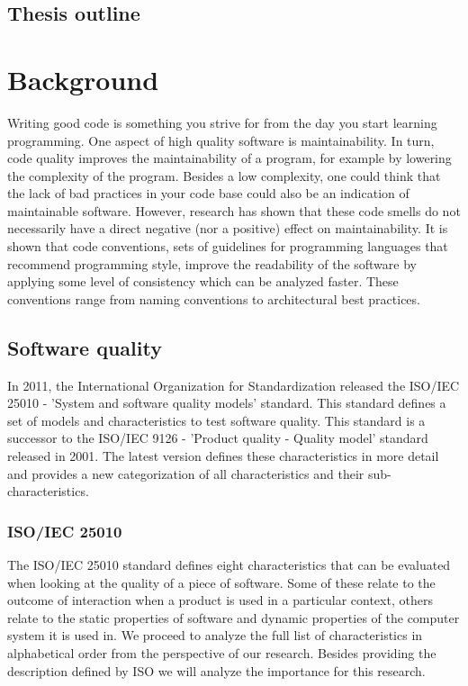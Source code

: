 \documentclass[twoside]{uva-inf-bachelor-thesis}
\begin{document}
\section{Thesis outline}

\chapter{Background}
\label{chapter:background}
Writing good code is something you strive for from the day you start learning programming. One aspect of high quality software is maintainability\cite{ISO9126,ISO25010}. In turn, code quality improves the maintainability of a program, for example by lowering the complexity of the program\cite{banker1993software}. Besides a low complexity, one could think that the lack of bad practices in your code base could also be an indication of maintainable software. However, research has shown that these code smells do not necessarily have a direct negative (nor a positive) effect on maintainability\cite{sjoberg2013quantifying}. It is shown that code conventions, sets of guidelines for programming languages that recommend programming style, improve the readability of the software by applying some level of consistency which can be analyzed faster\cite{javaconventions}. These conventions range from naming conventions to architectural best practices.

\section{Software quality}
In 2011, the International Organization for Standardization released the ISO/IEC 25010 - 'System and software quality models' standard\cite{ISO25010}. This standard defines a set of models and characteristics to test software quality. This standard is a successor to the ISO/IEC 9126 - 'Product quality - Quality model' standard\cite{ISO9126} released in 2001. The latest version defines these characteristics in more detail and provides a new categorization of all characteristics and their sub-characteristics.

\subsection{ISO/IEC 25010}
The ISO/IEC 25010 standard defines eight characteristics that can be evaluated when looking at the quality of a piece of software. Some of these relate to the outcome of interaction when a product is used in a particular context, others relate to the static properties of software and dynamic properties of the computer system it is used in. We proceed to analyze the full list of characteristics in alphabetical order from the perspective of our research. Besides providing the description defined by ISO we will analyze the importance for this research.
\end{document}
